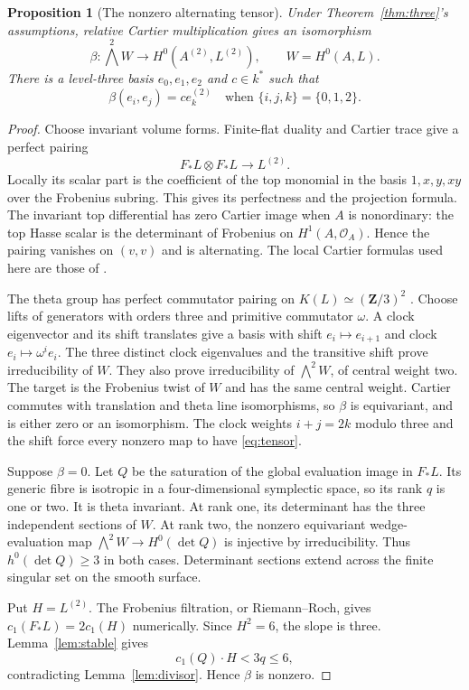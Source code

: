\documentclass[11pt]{article}
\newtheorem{proposition}[theorem]{Proposition}
\theoremstyle{remark}\newtheorem{remark}[theorem]{Remark}
\newcommand{\OO}{\mathcal O}
\newcommand{\ZZ}{\mathbf Z}
\begin{document}
\begin{proposition}[The nonzero alternating tensor]\label{prop:tensor}
Under Theorem~\ref{thm:three}'s assumptions, relative Cartier multiplication gives an isomorphism
\[
 \beta:\bigwedge^2 W\longrightarrow H^0(A^{(2)},L^{(2)}),
 \qquad W=H^0(A,L).
\]
There is a level-three basis $e_0,e_1,e_2$ and $c\in k^*$ such that
\begin{equation}\label{eq:tensor}
 \beta(e_i,e_j)=c e_k^{(2)}\quad
                    \text{when }\{i,j,k\}=\{0,1,2\}.
\end{equation}
\end{proposition}
\begin{proof}
Choose invariant volume forms. Finite-flat duality and Cartier trace give a perfect pairing
\[
                 F_*L\otimes F_*L\longrightarrow L^{(2)}.
\]
Locally its scalar part is the coefficient of the top monomial in the basis $1,x,y,xy$ over the Frobenius subring. This gives its perfectness and the projection formula. The invariant top differential has zero Cartier image when $A$ is nonordinary: the top Hasse scalar is the determinant of Frobenius on $H^1(A,\OO_A)$. Hence the pairing vanishes on $(v,v)$ and is alternating. The local Cartier formulas used here are those of \citet[0, (2.1.4)--(2.1.13), pp.~514--515]{Illusie}.

The theta group has perfect commutator pairing on $K(L)\simeq(\ZZ/3)^2$ \citep[Proposition~8.19, Corollary~8.20, Lemma~8.24 and Theorem~8.28, pp.~119--123]{EGM}. Choose lifts of generators with orders three and primitive commutator $\omega$. A clock eigenvector and its shift translates give a basis with shift $e_i\mapsto e_{i+1}$ and clock $e_i\mapsto\omega^i e_i$. The three distinct clock eigenvalues and the transitive shift prove irreducibility of $W$. They also prove irreducibility of $\bigwedge^2W$, of central weight two. The target is the Frobenius twist of $W$ and has the same central weight. Cartier commutes with translation and theta line isomorphisms, so $\beta$ is equivariant, and is either zero or an isomorphism. The clock weights $i+j=2k$ modulo three and the shift force every nonzero map to have \eqref{eq:tensor}.

Suppose $\beta=0$. Let $Q$ be the saturation of the global evaluation image in $F_*L$. Its generic fibre is isotropic in a four-dimensional symplectic space, so its rank $q$ is one or two. It is theta invariant. At rank one, its determinant has the three independent sections of $W$. At rank two, the nonzero equivariant wedge-evaluation map $\bigwedge^2W\to H^0(\det Q)$ is injective by irreducibility. Thus $h^0(\det Q)\ge3$ in both cases. Determinant sections extend across the finite singular set on the smooth surface.

Put $H=L^{(2)}$. The Frobenius filtration, or Riemann--Roch, gives $c_1(F_*L)=2c_1(H)$ numerically. Since $H^2=6$, the slope is three. Lemma~\ref{lem:stable} gives
\[
                         c_1(Q)\cdot H<3q\le6,
\]
contradicting Lemma~\ref{lem:divisor}. Hence $\beta$ is nonzero.
\end{proof}
\end{document}
